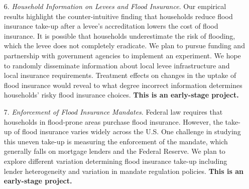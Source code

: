 \begin{enumerate}
\item[6.] \textit{Household Information on Levees and Flood Insurance}. Our empirical results highlight the counter-intuitive finding that households reduce flood insurance take-up after a levee’s accreditation lowers the cost of flood insurance. It is possible that households underestimate the risk of flooding, which the levee does not completely eradicate. We plan to pursue funding and partnership with government agencies to implement an experiment. We hope to randomly disseminate information about local levee infrastructure and local insurance requirements. Treatment effects on changes in the uptake of flood insurance would reveal to what degree incorrect information determines households’ risky flood insurance choices. \textbf{This is an early-stage project.}
\item[7.] \textit{Enforcement of Flood Insurance Mandates}. Federal law requires that households in flood-prone areas purchase flood insurance. However, the take-up of flood insurance varies widely across the U.S. One challenge in studying this uneven take-up is measuring the enforcement of the mandate, which generally falls on mortgage lenders and the Federal Reserve. We plan to explore different variation determining flood insurance take-up including lender heterogeneity and variation in mandate regulation policies. \textbf{This is an early-stage project.}
\end{enumerate}




